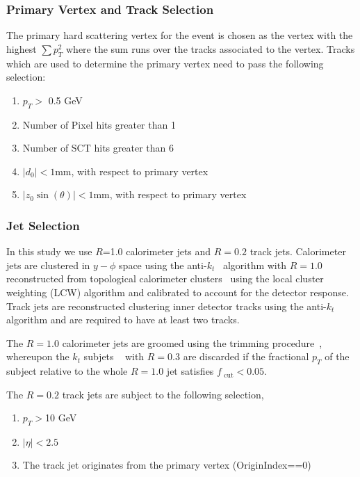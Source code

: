 \label{sec:gbb-obj}

\subsubsection{Primary Vertex and Track Selection}
The primary hard scattering vertex for the event is chosen as the vertex with the highest $\sum p_{T}^{2}$ where the sum runs over the tracks associated to the vertex. Tracks which are used to determine the primary vertex need to pass the following selection:
\begin{enumerate}
    \item $p_T>$ 0.5 GeV
    \item Number of Pixel hits greater than 1
    \item Number of SCT hits greater than 6
    \item $|d_0|<1$mm, with respect to primary vertex
    \item $|z_0\sin(\theta)|<1$mm, with respect to primary vertex
\end{enumerate}

\subsubsection{Jet Selection}
In this study we use $R$=1.0 calorimeter jets and $R=0.2$ track jets. Calorimeter jets are clustered in $y-\phi$ space using the anti-$k_t$~\cite{Cacciari:2008gp} algorithm with $R=1.0$ reconstructed from topological calorimeter clusters~\cite{TopoClusters} using the local cluster weighting (LCW) algorithm \cite{EndcapTBelectronPion2002} and calibrated to account for the detector response. Track jets are reconstructed clustering inner detector tracks using the anti-$k_t$ algorithm and are required to have at least two tracks.

\noindent The $R = 1.0$ calorimeter jets are groomed using the trimming procedure~\cite{Krohn:2009th}, whereupon the $k_{t}$ subjets ~\cite{Cacciari200657} with $R=0.3$ are discarded if the fractional $p_{T}$ of the subject relative to the whole $R=1.0$ jet satisfies $f_\text{ cut}<0.05$.  

\noindent The $R=0.2$ track jets are subject to the following selection, 
\begin{enumerate}
	\item $p_T>$10 GeV
	\item $|\eta|<2.5$	
	\item The track jet originates from the primary vertex (OriginIndex==0)
\end{enumerate}

